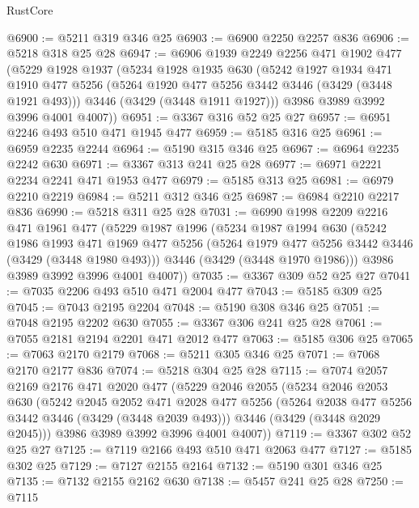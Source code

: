 \begin{lexlean}{RustCore}
\begin{coremodule}
@6900 := @5211 @319 @346 @25
@6903 := @6900 @2250 @2257 @836
@6906 := @5218 @318 @25 @28
@6947 := @6906
    @1939
    @2249
    @2256
    @471
    @1902
    @477
    (@5229
      @1928
      @1937
      (@5234
        @1928
        @1935
        @630
        (@5242
          @1927
          @1934
          @471
          @1910
          @477
          @5256
          (@5264 @1920 @477 @5256 @3442 @3446 (@3429 (@3448 @1921 @493)))
          @3446
          (@3429 (@3448 @1911 @1927)))
        @3986
        @3989
        @3992
        @3996
        @4001
        @4007))
@6951 := @3367 @316 @52 @25 @27
@6957 := @6951 @2246 @493 @510 @471 @1945 @477
@6959 := @5185 @316 @25
@6961 := @6959 @2235 @2244
@6964 := @5190 @315 @346 @25
@6967 := @6964 @2235 @2242 @630
@6971 := @3367 @313 @241 @25 @28
@6977 := @6971 @2221 @2234 @2241 @471 @1953 @477
@6979 := @5185 @313 @25
@6981 := @6979 @2210 @2219
@6984 := @5211 @312 @346 @25
@6987 := @6984 @2210 @2217 @836
@6990 := @5218 @311 @25 @28
@7031 := @6990
    @1998
    @2209
    @2216
    @471
    @1961
    @477
    (@5229
      @1987
      @1996
      (@5234
        @1987
        @1994
        @630
        (@5242
          @1986
          @1993
          @471
          @1969
          @477
          @5256
          (@5264 @1979 @477 @5256 @3442 @3446 (@3429 (@3448 @1980 @493)))
          @3446
          (@3429 (@3448 @1970 @1986)))
        @3986
        @3989
        @3992
        @3996
        @4001
        @4007))
@7035 := @3367 @309 @52 @25 @27
@7041 := @7035 @2206 @493 @510 @471 @2004 @477
@7043 := @5185 @309 @25
@7045 := @7043 @2195 @2204
@7048 := @5190 @308 @346 @25
@7051 := @7048 @2195 @2202 @630
@7055 := @3367 @306 @241 @25 @28
@7061 := @7055 @2181 @2194 @2201 @471 @2012 @477
@7063 := @5185 @306 @25
@7065 := @7063 @2170 @2179
@7068 := @5211 @305 @346 @25
@7071 := @7068 @2170 @2177 @836
@7074 := @5218 @304 @25 @28
@7115 := @7074
    @2057
    @2169
    @2176
    @471
    @2020
    @477
    (@5229
      @2046
      @2055
      (@5234
        @2046
        @2053
        @630
        (@5242
          @2045
          @2052
          @471
          @2028
          @477
          @5256
          (@5264 @2038 @477 @5256 @3442 @3446 (@3429 (@3448 @2039 @493)))
          @3446
          (@3429 (@3448 @2029 @2045)))
        @3986
        @3989
        @3992
        @3996
        @4001
        @4007))
@7119 := @3367 @302 @52 @25 @27
@7125 := @7119 @2166 @493 @510 @471 @2063 @477
@7127 := @5185 @302 @25
@7129 := @7127 @2155 @2164
@7132 := @5190 @301 @346 @25
@7135 := @7132 @2155 @2162 @630
@7138 := @5457 @241 @25 @28
@7250 := @7115

\end{coremodule}
\end{lexlean}
